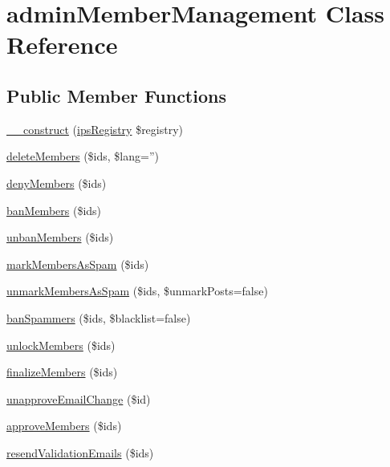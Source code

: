 \hypertarget{classadmin_member_management}{\section{admin\-Member\-Management Class Reference}
\label{classadmin_member_management}
}
\subsection*{Public Member Functions}
\begin{DoxyCompactItemize}
\item 
\hyperlink{classadmin_member_management_a178c3a93e57e75dd87a5d39112af0b07}{\-\_\-\-\_\-construct} (\hyperlink{classips_registry}{ips\-Registry} \$registry)
\item 
\hyperlink{classadmin_member_management_a1a1b38e07b553b60b718186b7d3d3c49}{delete\-Members} (\$ids, \$lang='')
\item 
\hyperlink{classadmin_member_management_a4713fb8a1175c7a9d45da4fd76e3a2a3}{deny\-Members} (\$ids)
\item 
\hyperlink{classadmin_member_management_af66281c1a7a67f4161ce430dd7cbd403}{ban\-Members} (\$ids)
\item 
\hyperlink{classadmin_member_management_ae5499ce7aac15287656405d156567d36}{unban\-Members} (\$ids)
\item 
\hyperlink{classadmin_member_management_a9b780e18e0074755dbb3fae2fcaf5e71}{mark\-Members\-As\-Spam} (\$ids)
\item 
\hyperlink{classadmin_member_management_ab4a5f6f3c0b73b24bad982626e52ff66}{unmark\-Members\-As\-Spam} (\$ids, \$unmark\-Posts=false)
\item 
\hyperlink{classadmin_member_management_a4e32f72b2f1a9e61658b0a8eb8a527a3}{ban\-Spammers} (\$ids, \$blacklist=false)
\item 
\hyperlink{classadmin_member_management_ab54604eaa27c028cd4893fa730a70fd0}{unlock\-Members} (\$ids)
\item 
\hyperlink{classadmin_member_management_a33392a30a01d41bd542b1c852881e80b}{finalize\-Members} (\$ids)
\item 
\hyperlink{classadmin_member_management_addb03e36d674cc803f5e01ff5b635537}{unapprove\-Email\-Change} (\$id)
\item 
\hyperlink{classadmin_member_management_a56416851b40a2778473998f8792563b8}{approve\-Members} (\$ids)
\item 
\hyperlink{classadmin_member_management_aa10afb18fe2345dee64c189a049aabd0}{resend\-Validation\-Emails} (\$ids)
\end{DoxyCompactItemize}
